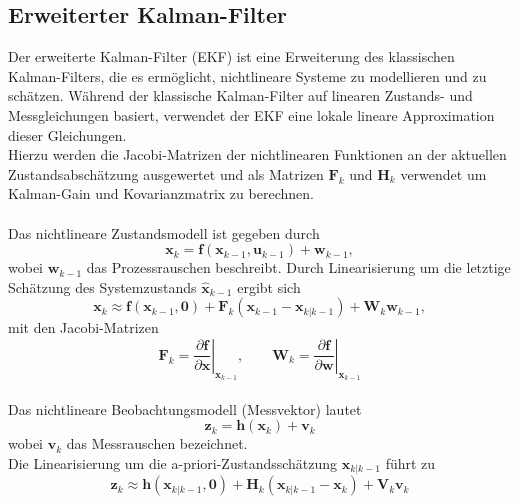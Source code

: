 \subsection{Erweiterter Kalman-Filter}
\label{subsec:erweiterter_kalman_filter}
Der erweiterte Kalman-Filter (EKF) ist eine Erweiterung des klassischen Kalman-Filters, die es ermöglicht, nichtlineare Systeme zu modellieren und zu schätzen. Während der klassische Kalman-Filter auf linearen Zustands- und Messgleichungen basiert, verwendet der EKF eine lokale lineare Approximation dieser Gleichungen.
\\
Hierzu werden die Jacobi-Matrizen der nichtlinearen Funktionen an der
aktuellen Zustandsabschätzung ausgewertet und als 
Matrizen $\mathbf{F}_k$ und $\mathbf{H}_k$ verwendet um Kalman-Gain und Kovarianzmatrix zu berechnen.
\\
\\
Das nichtlineare Zustandsmodell ist gegeben durch
\begin{equation}
\mathbf{x}_k = \mathbf{f}(\mathbf{x}_{k-1}, \mathbf{u}_{k-1}) + \mathbf{w}_{k-1},
\end{equation}
wobei $\mathbf{w}_{k-1}$ das Prozessrauschen beschreibt.
Durch Linearisierung um die letztige Schätzung des Systemzustands
$\hat{\mathbf{x}}_{k-1}$ ergibt sich
\begin{equation}
\mathbf{x}_k \approx \mathbf{f}({\mathbf{x}}_{k-1}, \mathbf{0})
+ \mathbf{F}_k (\mathbf{x}_{k-1} - {\mathbf{x}}_{k|k-1})
+ \mathbf{W}_k \mathbf{w}_{k-1},
\end{equation}
mit den Jacobi-Matrizen
\begin{equation}
\mathbf{F}_k =
\left.\frac{\partial \mathbf{f}}{\partial \mathbf{x}}\right|_{{\mathbf{x}}_{k-1}},
\qquad
\mathbf{W}_k =
\left.\frac{\partial \mathbf{f}}{\partial \mathbf{w}}\right|_{{\mathbf{x}}_{k-1}}
\end{equation}
\\
Das nichtlineare Beobachtungsmodell (Messvektor) lautet
\begin{equation}
\mathbf{z}_k = \mathbf{h}(\mathbf{x}_k) + \mathbf{v}_k
\end{equation}
wobei $\mathbf{v}_k$ das Messrauschen bezeichnet.
\\
Die Linearisierung um die a-priori-Zustandsschätzung
${\mathbf{x}}_{k|k-1}$ führt zu
\begin{equation}
\mathbf{z}_k \approx \mathbf{h}({\mathbf{x}}_{k|k-1}, \mathbf{0})
+ \mathbf{H}_k ({\mathbf{x}}_{k|k-1} - \mathbf{x}_k)
+ \mathbf{V}_k \mathbf{v}_k
\end{equation}
